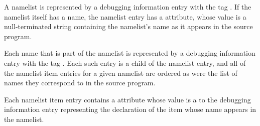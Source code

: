 A namelist is represented by a debugging information entry
with the 
tag \DWTAGnamelistTARG. 
If the namelist itself has a
name, the namelist entry has a \DWATname{} attribute,
whose
value is a null-terminated string containing the namelist\textquoteright s
name as it appears in the source program.

Each 
\hypertarget{chap:DWATnamelistitemnamelistitem}{}
name that is part of the namelist is represented
by a debugging information entry with the tag
\DWTAGnamelistitemTARG. 
Each such entry is a child of the
namelist entry, and all of the 
namelist item entries for a
given namelist are ordered as were the list of names they
correspond to in the source program.

Each namelist item entry contains a 
\DWATnamelistitem{} attribute
whose 
value is a  to the debugging
information entry representing the declaration of the item
whose name appears in the namelist.


